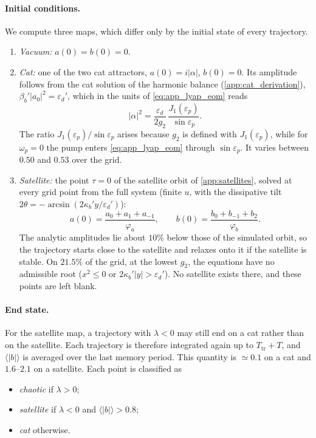 \documentclass[aps,prx,reprint,floatfix,amsmath,amssymb,longbibliography]{revtex4-2}
\begin{document}
\paragraph*{Initial conditions.}
We compute three maps, which differ only by the initial state of every trajectory.
\begin{enumerate}
    \item \emph{Vacuum:} $a(0) = b(0) = 0$.
    \item \emph{Cat:} one of the two cat attractors, $a(0) = i|\alpha|$, $b(0) = 0$. Its amplitude follows from the cat solution of the harmonic balance (\cref{app:cat_derivation}), $\beta_b'|a_0|^2 = \varepsilon_d'$, which in the units of \cref{eq:app_lyap_eom} reads
    \begin{equation}
        |\alpha|^2 = \frac{\varepsilon_d}{2g_2}\,\frac{J_1(\varepsilon_p)}{\sin\varepsilon_p}.
    \end{equation}
    The ratio $J_1(\varepsilon_p)/\sin\varepsilon_p$ arises because $g_2$ is defined with $J_1(\varepsilon_p)$, while for $\omega_p = 0$ the pump enters \cref{eq:app_lyap_eom} through $\sin\varepsilon_p$. It varies between $0.50$ and $0.53$ over the grid.
    \item \emph{Satellite:} the point $\tau = 0$ of the satellite orbit of \cref{app:satellites}, solved at every grid point from the full system (finite $u$, with the dissipative tilt $2\theta = -\arcsin(2\kappa_b'y/\varepsilon_d')$):
    \begin{equation}
        a(0) = \frac{a_0 + a_1 + a_{-1}}{\varphi_a}, \qquad b(0) = \frac{b_0 + b_{-1} + b_2}{\varphi_b}.
    \end{equation}
    The analytic amplitudes lie about $10\%$ below those of the simulated orbit, so the trajectory starts close to the satellite and relaxes onto it if the satellite is stable. On $21.5\%$ of the grid, at the lowest $g_2$, the equations have no admissible root ($x^2 \le 0$ or $2\kappa_b'|y| > \varepsilon_d'$). No satellite exists there, and these points are left blank.
\end{enumerate}

\paragraph*{End state.}
For the satellite map, a trajectory with $\lambda < 0$ may still end on a cat rather than on the satellite. Each trajectory is therefore integrated again up to $T_\text{tr} + T$, and $\langle |b| \rangle$ is averaged over the last memory period. This quantity is $\simeq 0.1$ on a cat and $1.6$--$2.1$ on a satellite. Each point is classified as
\begin{itemize}
    \item \emph{chaotic} if $\lambda > 0$;
    \item \emph{satellite} if $\lambda < 0$ and $\langle|b|\rangle > 0.8$;
    \item \emph{cat} otherwise.
\end{itemize}
\end{document}
